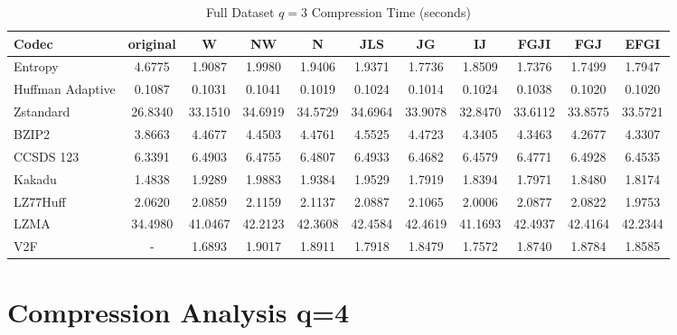 \documentclass{article}
\begin{document}
\begin{table}[h!]
\centering
\caption{Full Dataset $q=3$ Compression Time (seconds)}
\begin{tabular}{|l|cccccccccc|}
\hline
Codec &  original &       W &      NW &       N &     JLS &      JG &      IJ &    FGJI &     FGJ &    EFGI \\
\hline
Entropy & 4.6775 & 1.9087 & 1.9980 & 1.9406 & 1.9371 & 1.7736 & 1.8509 & 1.7376 & 1.7499 & 1.7947         \\
\hline
Huffman Adaptive &    0.1087 &  0.1031 &  0.1041 &  0.1019 &  0.1024 &  0.1014 &  0.1024 &  0.1038 &  0.1020 &  0.1020 \\
Zstandard        &   26.8340 & 33.1510 & 34.6919 & 34.5729 & 34.6964 & 33.9078 & 32.8470 & 33.6112 & 33.8575 & 33.5721 \\
BZIP2            &    3.8663 &  4.4677 &  4.4503 &  4.4761 &  4.5525 &  4.4723 &  4.3405 &  4.3463 &  4.2677 &  4.3307 \\
CCSDS 123        &    6.3391 &  6.4903 &  6.4755 &  6.4807 &  6.4933 &  6.4682 &  6.4579 &  6.4771 &  6.4928 &  6.4535 \\
Kakadu           &    1.4838 &  1.9289 &  1.9883 &  1.9384 &  1.9529 &  1.7919 &  1.8394 &  1.7971 &  1.8480 &  1.8174 \\
LZ77Huff         &    2.0620 &  2.0859 &  2.1159 &  2.1137 &  2.0887 &  2.1065 &  2.0006 &  2.0877 &  2.0822 &  1.9753 \\
LZMA             &   34.4980 & 41.0467 & 42.2123 & 42.3608 & 42.4584 & 42.4619 & 41.1693 & 42.4937 & 42.4164 & 42.2344 \\
V2F              &    - &  1.6893 &  1.9017 &  1.8911 &  1.7918 &  1.8479 &  1.7572 &  1.8740 &  1.8784 &  1.8585 \\
\hline
\end{tabular}
\end{table}

\newpage
\section{Compression Analysis q=4}
\end{document}
